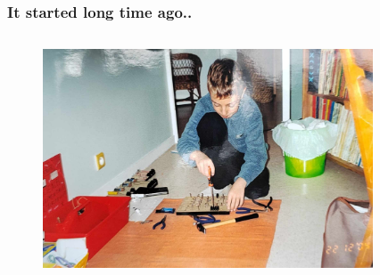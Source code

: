 \begin{frame}
\begin{columns}
\begin{column}{0.65\textwidth}
\begin{figure}[H]
	\end{figure}
\end{column}
\end{columns}
\end{frame}

\begin{frame}
\frametitle{It started long time ago..}
\begin{columns}
\begin{column}{0.6\textwidth}
	\begin{figure}[H]
		\centering
		\includegraphics[width=\textwidth]{moi1.jpg}
	\end{figure}
\end{column}
\begin{column}{0.4\textwidth}
	\begin{figure}[H]
		\centering

\end{figure}
\end{column}
\end{columns}
\end{frame}
